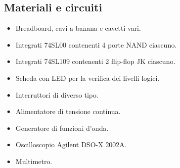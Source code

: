 \subsection{Materiali e circuiti}

\begin{itemize}
    \item{Breadboard, cavi a banana e cavetti vari.}
    \item{Integrati 74SL00 contenenti 4 porte NAND ciascuno.}
    \item{Integrati 74SL109 contenenti 2 flip-flop JK ciascuno.}
    \item{Scheda con LED per la verifica dei livelli logici.}
    \item{Interruttori di diverso tipo.}
    \item{Alimentatore di tensione continua.}
    \item{Generatore di funzioni d'onda.}
    \item{Oscilloscopio Agilent DSO-X 2002A.}
    \item{Multimetro.}
\end{itemize}
